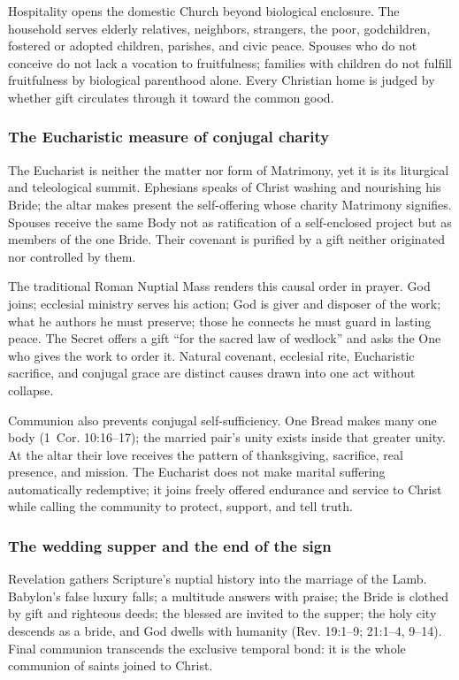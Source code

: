 Hospitality opens the domestic Church beyond biological enclosure. The household serves elderly relatives, neighbors, strangers, the poor, godchildren, fostered or adopted children, parishes, and civic peace. Spouses who do not conceive do not lack a vocation to fruitfulness; families with children do not fulfill fruitfulness by biological parenthood alone. Every Christian home is judged by whether gift circulates through it toward the common good.

\subsubsection{The Eucharistic measure of conjugal charity}

The Eucharist is neither the matter nor form of Matrimony, yet it is its liturgical and teleological summit. Ephesians speaks of Christ washing and nourishing his Bride; the altar makes present the self-offering whose charity Matrimony signifies. Spouses receive the same Body not as ratification of a self-enclosed project but as members of the one Bride. Their covenant is purified by a gift neither originated nor controlled by them.

The traditional Roman Nuptial Mass renders this causal order in prayer. God joins; ecclesial ministry serves his action; God is giver and disposer of the work; what he authors he must preserve; those he connects he must guard in lasting peace. The Secret offers a gift ``for the sacred law of wedlock'' and asks the One who gives the work to order it. Natural covenant, ecclesial rite, Eucharistic sacrifice, and conjugal grace are distinct causes drawn into one act without collapse.

Communion also prevents conjugal self-sufficiency. One Bread makes many one body (1~Cor. 10:16--17); the married pair's unity exists inside that greater unity. At the altar their love receives the pattern of thanksgiving, sacrifice, real presence, and mission. The Eucharist does not make marital suffering automatically redemptive; it joins freely offered endurance and service to Christ while calling the community to protect, support, and tell truth.

\subsubsection{The wedding supper and the end of the sign}

Revelation gathers Scripture's nuptial history into the marriage of the Lamb. Babylon's false luxury falls; a multitude answers with praise; the Bride is clothed by gift and righteous deeds; the blessed are invited to the supper; the holy city descends as a bride, and God dwells with humanity (Rev. 19:1--9; 21:1--4, 9--14). Final communion transcends the exclusive temporal bond: it is the whole communion of saints joined to Christ.

